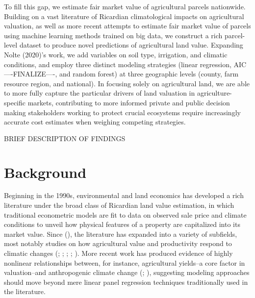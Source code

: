 \documentclass[12pt]{article}
\begin{document}
\par To fill this gap, we estimate fair market value of agricultural parcels nationwide. Building on a vast literature of Ricardian climatological impacts on agricultural valuation, as well as more recent attempts to estimate fair market value of parcels using machine learning methods trained on big data, we construct a rich parcel-level dataset to produce novel predictions of agricultural land value. Expanding Nolte (2020)'s work, we add variables on soil type, irrigation, and climatic conditions, and employ three distinct modeling strategies (linear regression, AIC ----FINALIZE----, and random forest) at three geographic levels (county, farm resource region, and national). In focusing solely on agricultural land, we are able to more fully capture the particular drivers of land valuation in agriculture-specific markets, contributing to more informed private and public decision making  stakeholders working to protect crucial ecosystems require increasingly accurate cost estimates when weighing competing strategies.

BRIEF DESCRIPTION OF FINDINGS

\section{Background}
Beginning in the 1990s, environmental and land economics has developed a rich literature under the broad class of Ricardian land value estimation, in which traditional econometric models are fit to data on observed sale price and climate conditions to unveil how physical features of a property are capitalized into its market value. Since (\cite{Mendelsohn1994TheAnalysis}), the literature has expanded into a variety of subfields, most notably studies on how agricultural value and productivity respond to climatic changes (\cite{Schlenker2005WillApproach}; \cite{Schlenker2006TheConditions}; \cite{Nelson2014ClimateShocks}; \cite{Mendelsohn2003ClimateAgriculture}; \cite{Bozzola2018AAgriculture}). More recent work has produced evidence of highly nonlinear relationships between, for instance, agricultural yields--a core factor in valuation--and anthropogenic climate change (\cite{Schlenker2006NonlinearYields}; \cite{Schlenker2009NonlinearChange}), suggesting modeling approaches should move beyond mere linear panel regression techniques traditionally used in the literature.
\end{document}
